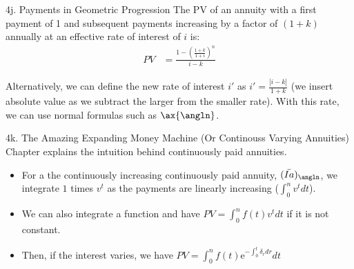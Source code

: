 \begin{CHPT_SUMM_AUTO}[label = {L.-4j}]{4j. Payments in Geometric Progression}
The PV of an annuity with a first payment of 1 and subsequent payments increasing by a factor of $(1 + k)$ annually at an effective rate of interest of $i$ is:
\begin{align*}
	PV	
	&=	\frac{1 - \left( \frac{1 + k}{1 + i} \right)^{n}}{i - k}
\end{align*}

Alternatively, we can define the new rate of interest $i'$ as $i' = \frac{|i - k|}{1 + k}$ (we insert absolute value as we subtract the larger from the smaller rate). With this rate, we can use normal formulas such as $\ax{\angln}$.
\end{CHPT_SUMM_AUTO}

\begin{CHPT_SUMM_AUTO}[label = {L.-4k}]{4k. The Amazing Expanding Money Machine (Or Continouss Varying Annuities)}
Chapter explains the intuition behind continuously paid annuities.

\begin{itemize}[leftmargin = *]
	\item	For a the continuously increasing continuously paid annuity, $(\bar{Ia})_{\angln}$, we integrate $1$ times $v^{t}$ as the payments are linearly increasing ($\int_{0}^{n}v^{t}dt$).
	\item	We can also integrate a function and have $PV = \int_{0}^{n} f(t) v^{t}dt$ if it is not constant.
	\item	Then, if the interest varies, we have $PV = \int_{0}^{n} f(t) \textrm{e}^{-\int_{0}^{t}\delta_{r}dr}dt$
\end{itemize}
\end{CHPT_SUMM_AUTO}

